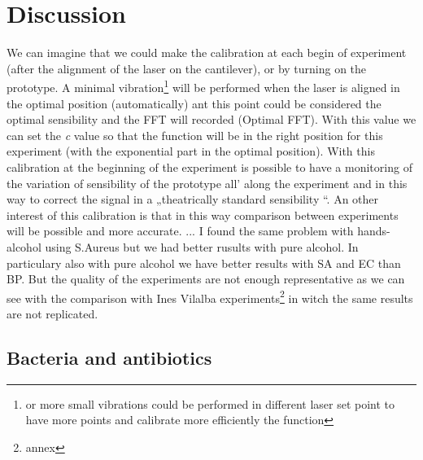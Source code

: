 \documentclass[11pt, a4paper]{article}
\begin{document}
\section{Discussion}
We can imagine that we could make the calibration at each begin of experiment (after the alignment of the laser on the cantilever), or by turning on the prototype. A minimal vibration\footnote{or more small vibrations could be performed in different laser set point to have more points and calibrate more efficiently the function} will be performed when the laser is aligned in the optimal position (automatically) ant this point could be considered the optimal sensibility and the FFT will recorded (Optimal FFT). With this value we can set the \textit{c} value so that the function will be in the right position for this experiment (with the exponential part in the optimal position). With this calibration at the beginning of the experiment is possible to have a monitoring of the variation of sensibility of the prototype all’ along the experiment and in this way to correct the signal in a „theatrically standard sensibility “. An other interest of this calibration is that in this way comparison between experiments will be possible and more accurate. 
...
I found the same problem with hands-alcohol using S.Aureus but we had better rusults with pure alcohol. In particulary also with pure alcohol we have better results with SA and EC than BP. But the quality of the experiments are not enough representative as we can see with the comparison with Ines Vilalba experiments\footnote{annex} in witch the same results are not replicated. 

\subsection{Bacteria and antibiotics} %
\end{document}
